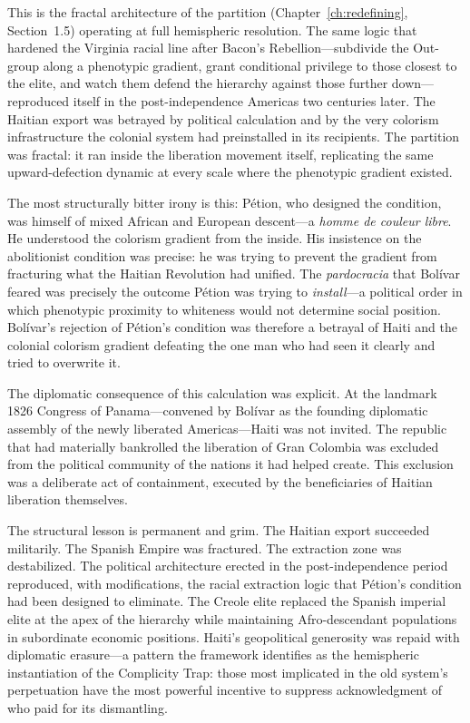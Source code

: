 This is the fractal architecture of the partition (Chapter~\ref{ch:redefining}, Section~1.5) operating at full hemispheric resolution. The same logic that hardened the Virginia racial line after Bacon's Rebellion---subdivide the Out-group along a phenotypic gradient, grant conditional privilege to those closest to the elite, and watch them defend the hierarchy against those further down---reproduced itself in the post-independence Americas two centuries later. The Haitian export was betrayed by political calculation and by the very colorism infrastructure the colonial system had preinstalled in its recipients. The partition was fractal: it ran inside the liberation movement itself, replicating the same upward-defection dynamic at every scale where the phenotypic gradient existed.

The most structurally bitter irony is this: Pétion, who designed the condition, was himself of mixed African and European descent---a \textit{homme de couleur libre}. He understood the colorism gradient from the inside. His insistence on the abolitionist condition was precise: he was trying to prevent the gradient from fracturing what the Haitian Revolution had unified. The \textit{pardocracia} that Bolívar feared was precisely the outcome Pétion was trying to \textit{install}---a political order in which phenotypic proximity to whiteness would not determine social position. Bolívar's rejection of Pétion's condition was therefore a betrayal of Haiti and the colonial colorism gradient defeating the one man who had seen it clearly and tried to overwrite it.

The diplomatic consequence of this calculation was explicit. At the landmark 1826 Congress of Panama---convened by Bolívar as the founding diplomatic assembly of the newly liberated Americas---Haiti was not invited. The republic that had materially bankrolled the liberation of Gran Colombia was excluded from the political community of the nations it had helped create. This exclusion was a deliberate act of containment, executed by the beneficiaries of Haitian liberation themselves.

The structural lesson is permanent and grim. The Haitian export succeeded militarily. The Spanish Empire was fractured. The extraction zone was destabilized. The political architecture erected in the post-independence period reproduced, with modifications, the racial extraction logic that Pétion's condition had been designed to eliminate. The Creole elite replaced the Spanish imperial elite at the apex of the hierarchy while maintaining Afro-descendant populations in subordinate economic positions. Haiti's geopolitical generosity was repaid with diplomatic erasure---a pattern the framework identifies as the hemispheric instantiation of the Complicity Trap: those most implicated in the old system's perpetuation have the most powerful incentive to suppress acknowledgment of who paid for its dismantling.

